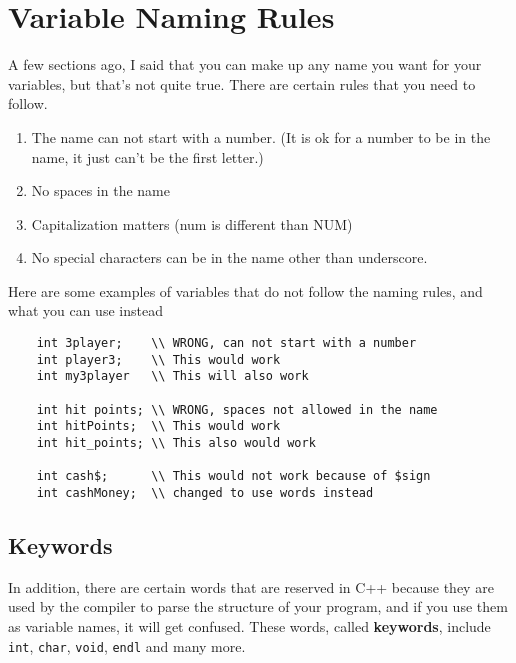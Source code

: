 \section{Variable Naming Rules}
A few sections ago, I said that you can make up any name you
want for your variables, but that's not quite true. There are certain rules that you need to follow.
\begin{enumerate}
    \item The name can not start with a number. (It is ok for a number to be in the name, it just can't be the first letter.)
    \item No spaces in the name
    \item Capitalization matters (num is different than NUM) 
    \item No special characters can be in the name other than underscore.
\end{enumerate}

Here are some examples of variables that do not follow the naming rules, and what you can use instead
\begin{mdframed}
\begin{verbatim}
    int 3player;    \\ WRONG, can not start with a number
    int player3;    \\ This would work
    int my3player   \\ This will also work
    
    int hit points; \\ WRONG, spaces not allowed in the name
    int hitPoints;  \\ This would work
    int hit_points; \\ This also would work
    
    int cash$;      \\ This would not work because of $sign
    int cashMoney;  \\ changed to use words instead
\end{verbatim}
\end{mdframed}
\subsection{Keywords}
In addition, there
are certain words that are reserved in C++ because they are
used by the compiler to parse the structure of your program,
and if you use them as variable names, it will get confused.
These words, called {\bf keywords}, include {\tt int},
{\tt char}, {\tt void}, {\tt endl} and many more.

